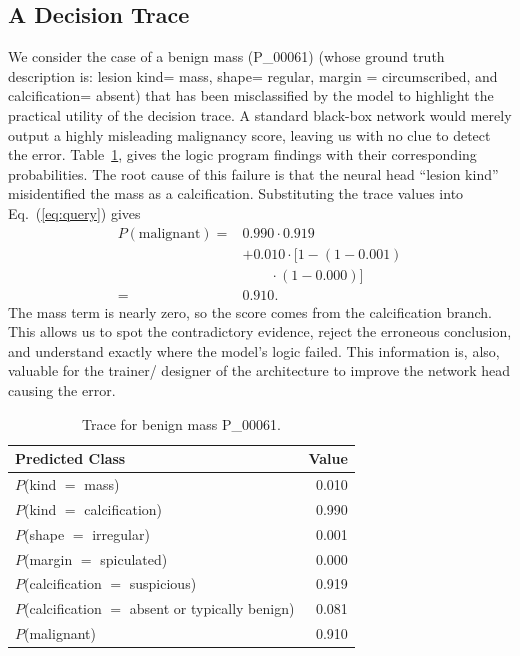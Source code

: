 \subsection{A Decision Trace}
\label{sec:traces}

We consider the case of a benign mass (P\_00061) (whose ground truth description is: lesion kind= mass, shape= regular, margin = circumscribed, and calcification= absent) that has been misclassified by the model to highlight the practical utility of the decision trace. A standard black-box network would merely output a highly misleading malignancy score, leaving us with no clue to detect the error. Table~\ref{tab:trace}, gives the logic program findings with their corresponding probabilities. The root cause of this failure is that the neural head ``lesion kind'' misidentified the mass as a calcification. Substituting the trace values into Eq.~(\ref{eq:query}) gives
\begin{equation*}
\begin{split}
P(\mathrm{malignant}) ={}& 0.990 \cdot 0.919 \\
&+ 0.010 \cdot \Big[1-(1-0.001)\\
&\qquad\cdot(1-0.000)\Big] \\
={}& 0.910.
\end{split}
\end{equation*}
The mass term is nearly zero, so the score comes from the calcification branch. This allows us to spot the contradictory evidence, reject the erroneous conclusion, and understand exactly where the model's logic failed. This information is, also, valuable for the trainer/ designer of the architecture to improve the network head causing the error.

\begin{table}[!t]
\caption{Trace for benign mass P\_00061. }
\label{tab:trace}
\centering
\footnotesize
\setlength{\tabcolsep}{4pt}
\begin{tabular}{@{}lr@{}}
\toprule
Predicted Class & Value \\
\midrule
$P$(kind $=$ mass) & 0.010 \\
$P$(kind $=$ calcification) & 0.990 \\
$P$(shape $=$ irregular) & 0.001 \\
$P$(margin $=$ spiculated) & 0.000 \\
$P$(calcification $=$ suspicious) & 0.919 \\
$P$(calcification $=$ absent or typically benign) & 0.081 \\
\midrule
$P$(malignant) & 0.910 \\
\bottomrule
\end{tabular}
\end{table}
